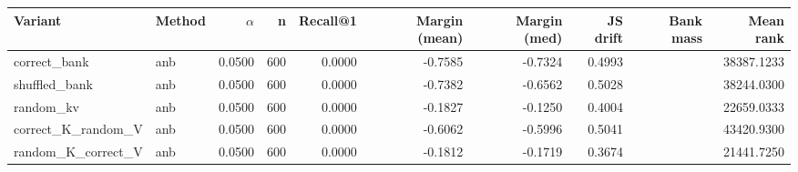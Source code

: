 \begin{tabular}{l l r r r r r r r r}
\toprule
Variant & Method & $\alpha$ & n & Recall@1 & Margin (mean) & Margin (med) & JS drift & Bank mass & Mean rank \\
\midrule
correct\_bank & anb & 0.0500 & 600 & 0.0000 & -0.7585 & -0.7324 & 0.4993 &  & 38387.1233 \\
shuffled\_bank & anb & 0.0500 & 600 & 0.0000 & -0.7382 & -0.6562 & 0.5028 &  & 38244.0300 \\
random\_kv & anb & 0.0500 & 600 & 0.0000 & -0.1827 & -0.1250 & 0.4004 &  & 22659.0333 \\
correct\_K\_random\_V & anb & 0.0500 & 600 & 0.0000 & -0.6062 & -0.5996 & 0.5041 &  & 43420.9300 \\
random\_K\_correct\_V & anb & 0.0500 & 600 & 0.0000 & -0.1812 & -0.1719 & 0.3674 &  & 21441.7250 \\
\bottomrule
\end{tabular}
